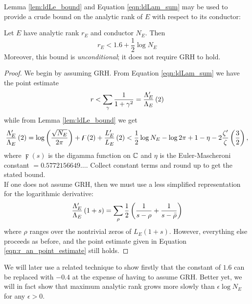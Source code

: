 Lemma \ref{lem:ldLe_bound} and Equation \ref{eqn:ldLam_sum} may be used to provide a crude bound on the analytic rank of $E$ with respect to its conductor:
\begin{corollary}\label{cor:logderiv_rank_bound}
Let $E$ have analytic rank $r_E$ and conductor $N_E$. Then
\begin{equation}
r_E < 1.6 + \frac{1}{2} \log N_E
\end{equation}
Moreover, this bound is {\it unconditional}; it does not require GRH to hold.
\end{corollary}
\begin{proof}
We begin by assuming GRH. From Equation \ref{eqn:ldLam_sum} we have the point estimate
\begin{equation}\label{eqn:r_an_point_estimate}
r < \sum_{\gamma} \frac{1}{1+\gamma^2} = \frac{\Lambda_E^{\prime}}{\Lambda_E}\left(2\right)
\end{equation}
while from Lemma \ref{lem:ldLe_bound} we get
\begin{equation}
\frac{\Lambda_E^{\prime}}{\Lambda_E}\left(2\right) =  \log\left(\frac{\sqrt{N_E}}{2\pi}\right) + \digamma(2) + \frac{L_E^{\prime}}{L_E}\left(2\right) < \frac{1}{2}\log N_E  - \log 2\pi + 1-\eta -2\frac{\zeta^{\prime}}{\zeta}\left(\frac{3}{2}\right),
\end{equation}
where $\digamma(s)$ is the digamma function on $\mathbb{C}$ and $\eta$ is the Euler-Mascheroni constant $= 0.5772156649\ldots$. Collect constant terms and round up to get the stated bound. \\

If one does not assume GRH, then we must use a less simplified representation for the logarithmic derivative:
\begin{equation}
\frac{\Lambda_E^{\prime}}{\Lambda_E}\left(1+s\right) = \sum_{\rho} \frac{1}{2}\left( \frac{1}{s-\rho} + \frac{1}{s-\bar{\rho}}\right)
\end{equation}
where $\rho$ ranges over the nontrivial zeros of $L_E(1+s)$. However, everything else proceeds as before, and the point estimate given in Equation \ref{eqn:r_an_point_estimate} still holds.
\end{proof}
We will later use a related technique to show firstly that the constant of $1.6$ can be replaced with $-0.4$ at the expense of having to assume GRH. Better yet, we will in fact show that maximum analytic rank grows more slowly than $\epsilon \log N_E$ for any $\epsilon>0$. \\

